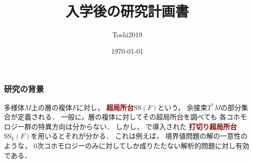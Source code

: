 


\newcommand{\Int}[1][]{\mathop{\mathrm{Int}}\nolimits_{#1}}
\newcommand{\Cl}[1][]{\mathop{\mathrm{Cl}}\nolimits_{#1}}
\newcommand{\Bd}[1][]{\mathop{\mathrm{Bd}}\nolimits_{#1}}
\newcommand{\bd}{\mathord{\partial}}
\newcommand{\Fr}[1][]{\mathop{\mathrm{Fr}}\nolimits_{#1}}


\newcommand{\mtan}[1][]{T\hspace{-1.75pt}{#1}}
\newcommand{\mtp}[1][]{{}^{t\!}{#1}} %
\newcommand{\mpb}[1][]{{#1}_{\pi}} %
\newcommand{\mdiff}[1][]{{#1}_{d}} %
\newcommand{\mptan}[1][]{{#1}_{\tau}} %



\newcommand{\cotb}[1][]{T^{\ast}{#1}}
\newcommand{\conm}[2][]{T_{#1}^{\hspace{0.7pt}\ast}{#2}}
\newcommand{\norb}[2][]{T_{#1}{#2}}

\newcommand{\cotz}[1][]{T^{\ast}_{#1}{#1}}

\newcommand{\cotn}[1][]{\dot{T}^{\ast}{#1}}


\newcommand{\muhom}{\mu hom}
\newcommand{\muHom}[1][]{\mathrm{Hom}^\mu_{\raise1.5ex\hbox to.1em{}#1}}

\newcommand{\mucat}[2][]{\mathsf{D}^{\mathrm{b}}_{#1}(#2)}

\newcommand{\conv}[1][]{\mathbin{\mathop{\circ}\limits_{#1}}}

\newcommand{\torus}{\mathbf{T}}

\newcommand{\const}{\mathrm{const.}}
\newcommand{\norm}[1][]{\left\lVert{#1}\right\rVert}
\newcommand{\abs}[1][]{\left\lvert{#1}\right\rvert}




\title{入学後の研究計画書}
\author{Toshi2019}
\date{\today}

\thispagestyle{empty}
\subsubsection*{研究の背景}
多様体\(M\)上の層の複体\(F\)に対し，
\textcolor{darkred}{\textbf{超局所台}}\(\mathrm{SS}(F)\)という，
余接束\(T^{\ast}M\)の部分集合が定義される．
一般に，層の複体に対してその超局所台を調べても
各コホモロジー群の特異方向は分からない．
しかし，
\cite{KMS03}で導入された
\textcolor{darkred}{\textbf{打切り超局所台}}\(
	\mathrm{SS}_{k}(F)
\)を用いるとそれが分かる．
これは例えば，
境界値問題の解の一意性のような，
\(0\)次コホモロジーのみに対してしか成りたたない解析的問題に対し有効である．

